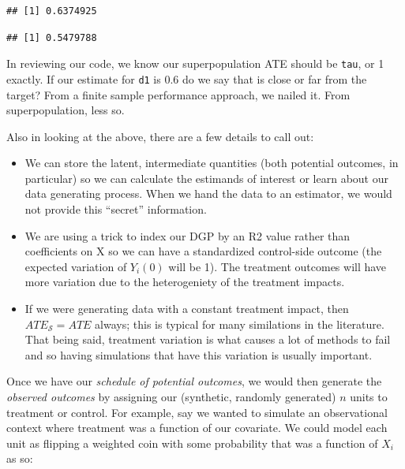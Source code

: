 \documentclass[
]{book}
\newenvironment{Shaded}{\begin{snugshade}}{\end{snugshade}}
\newcommand{\DecValTok}[1]{\textcolor[rgb]{0.00,0.00,0.81}{#1}}
\newcommand{\FunctionTok}[1]{\textcolor[rgb]{0.00,0.00,0.00}{#1}}
\newcommand{\NormalTok}[1]{#1}
\newcommand{\OtherTok}[1]{\textcolor[rgb]{0.56,0.35,0.01}{#1}}
\newcommand{\SpecialCharTok}[1]{\textcolor[rgb]{0.00,0.00,0.00}{#1}}
\providecommand{\tightlist}{%
  \setlength{\itemsep}{0pt}\setlength{\parskip}{0pt}}
\begin{document}
\begin{verbatim}
## [1] 0.6374925
\end{verbatim}

\begin{Shaded}
\end{Shaded}

\begin{verbatim}
## [1] 0.5479788
\end{verbatim}

In reviewing our code, we know our superpopulation ATE should be \texttt{tau}, or 1 exactly.
If our estimate for \texttt{d1} is 0.6 do we say that is close or far from the target?
From a finite sample performance approach, we nailed it.
From superpopulation, less so.

Also in looking at the above, there are a few details to call out:

\begin{itemize}
\tightlist
\item
  We can store the latent, intermediate quantities (both potential outcomes, in particular) so we can calculate the estimands of interest or learn about our data generating process. When we hand the data to an estimator, we would not provide this ``secret'' information.
\item
  We are using a trick to index our DGP by an R2 value rather than coefficients on X so we can have a standardized control-side outcome (the expected variation of \(Y_i(0)\) will be 1). The treatment outcomes will have more variation due to the heterogeniety of the treatment impacts.
\item
  If we were generating data with a constant treatment impact, then \(ATE_{\mathcal{S}} = ATE\) always; this is typical for many similations in the literature. That being said, treatment variation is what causes a lot of methods to fail and so having simulations that have this variation is usually important.
\end{itemize}

Once we have our \emph{schedule of potential outcomes}, we would then generate the \emph{observed outcomes} by assigning our (synthetic, randomly generated) \(n\) units to treatment or control.
For example, say we wanted to simulate an observational context where treatment was a function of our covariate.
We could model each unit as flipping a weighted coin with some probability that was a function of \(X_i\) as so:
\end{document}
